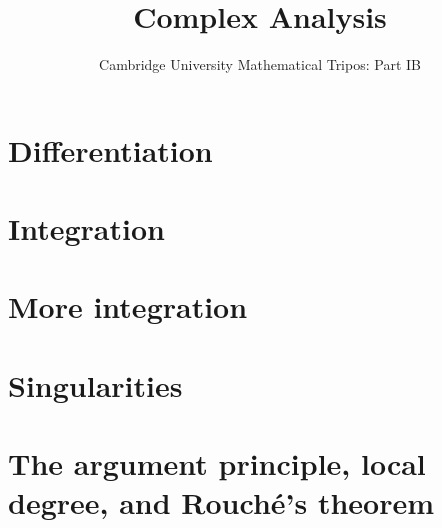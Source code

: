 \documentclass{article}
\title{Complex Analysis}
\author{Cambridge University Mathematical Tripos: Part IB}
\begin{document}
\maketitle

\tableofcontentsnewpage{}

\section{Differentiation}

\section{Integration}

\section{More integration}

\section{Singularities}

\section{The argument principle, local degree, and Rouch\'e's theorem}

\end{document}
